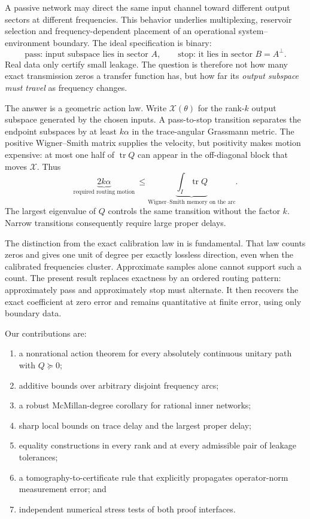 \documentclass[11pt]{article}
\theoremstyle{definition}
\theoremstyle{remark}
\newcommand{\tr}{\operatorname{tr}}
\begin{document}
A passive network may direct the same input channel toward different output
sectors at different frequencies.  This behavior underlies multiplexing,
reservoir selection and frequency-dependent placement of an operational
system--environment boundary.  The ideal specification is binary:
\[
 \text{pass: input subspace lies in sector }A,
 \qquad
 \text{stop: it lies in sector }B=A^\perp.
\]
Real data only certify small leakage.  The question is therefore not how
many exact transmission zeros a transfer function has, but how far its
\emph{output subspace must travel} as frequency changes.

The answer is a geometric action law.  Write $\mathcal X(\theta)$ for the
rank-$k$ output subspace generated by the chosen inputs.  A pass-to-stop
transition separates the endpoint subspaces by at least $k\alpha$ in the
trace-angular Grassmann metric.  The positive Wigner--Smith matrix supplies
the velocity, but positivity makes motion expensive: at most one half of
$\tr Q$ can appear in the off-diagonal block that moves $\mathcal X$.
Thus
\begin{equation}\label{eq:headline}
 \underbrace{2k\alpha}_{\text{required routing motion}}
 \ \leq
 \underbrace{\int_I\tr Q}_{\text{Wigner--Smith memory on the arc}}.
\end{equation}
The largest eigenvalue of $Q$ controls the same transition without the
factor $k$.  Narrow transitions consequently require large proper delays.

The distinction from the exact calibration law in
\cite{ErikssonMemory2026} is fundamental.  That law counts zeros and gives
one unit of degree per exactly lossless direction, even when the calibrated
frequencies cluster.  Approximate samples alone cannot support such a count.
The present result replaces exactness by an ordered routing pattern:
approximately pass and approximately stop must alternate.  It then recovers
the exact coefficient at zero error and remains quantitative at finite
error, using only boundary data.

Our contributions are:
\begin{enumerate}
 \item a nonrational action theorem for every absolutely continuous unitary
 path with $Q\succeq0$;
 \item additive bounds over arbitrary disjoint frequency arcs;
 \item a robust McMillan-degree corollary for rational inner networks;
 \item sharp local bounds on trace delay and the largest proper delay;
 \item equality constructions in every rank and at every admissible pair
 of leakage tolerances;
 \item a tomography-to-certificate rule that explicitly propagates
 operator-norm measurement error; and
 \item independent numerical stress tests of both proof interfaces.
\end{enumerate}
\end{document}
